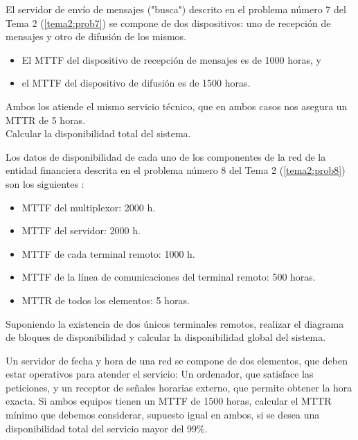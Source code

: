 \TheSolution



\Problem[3]
El servidor de envío de mensajes ("busca") descrito en el problema número 7 del Tema 2 (\ref{tema2:prob7}) se compone de dos dispositivos: uno de recepción de mensajes y otro de difusión de los mismos.
\begin{itemize}
\item El MTTF del dispositivo de recepción de mensajes es de 1000 horas, y
\item el MTTF del dispositivo de difusión es de 1500 horas.
\end{itemize}
Ambos los atiende el mismo servicio técnico, que en ambos casos nos asegura un MTTR de 5 horas.\\

Calcular la disponibilidad total del sistema.

\TheSolution



\Problem[4]
Los datos de disponibilidad de cada uno de los componentes de la red de la entidad financiera descrita en el problema número 8 del Tema 2 (\ref{tema2:prob8}) son los siguientes :
\begin{itemize}
	\item MTTF del multiplexor: 2000 h.
	\item MTTF del servidor: 2000 h.
	\item MTTF de cada terminal remoto: 1000 h.
	\item MTTF de la línea de comunicaciones del terminal remoto: 500 horas.
	\item MTTR de todos los elementos: 5 horas.
\end{itemize}

Suponiendo la existencia de dos únicos terminales remotos, realizar el diagrama de bloques de disponibilidad y calcular la disponibilidad global del sistema.

\TheSolution



\Problem[5]
Un servidor de fecha y hora de una red se compone de dos elementos, que deben estar operativos para
atender el servicio: Un ordenador, que satisface las peticiones, y un receptor
de señales horarias externo, que permite obtener la hora exacta. Si ambos equipos
tienen un MTTF de 1500 horas, calcular el MTTR mínimo que debemos considerar,
supuesto igual en ambos, si se desea una disponibilidad total del servicio mayor del 99\%.

